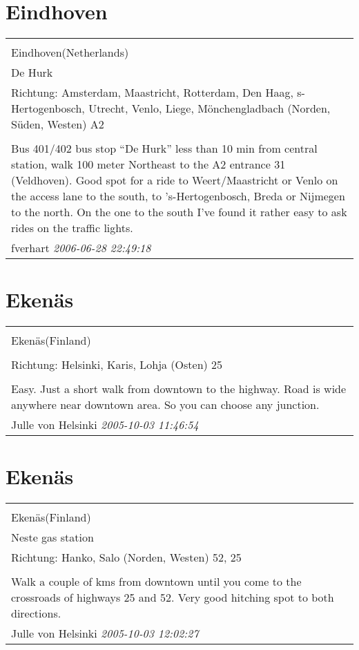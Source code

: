 \documentclass[a4paper,12pt]{article}
\begin{document}
\section{Eindhoven}
\begin{tabular}{|p{13cm}|}
\hline\\
Eindhoven(Netherlands)\\
De Hurk\\
Richtung: Amsterdam, Maastricht, Rotterdam, Den Haag, s-Hertogenbosch, Utrecht, Venlo, Liege, Mönchengladbach (Norden, Süden, Westen) A2 \\
\hline\\
Bus 401/402 bus stop “De Hurk” less than 10 min from central station, walk 100 meter Northeast to the A2 entrance 31 (Veldhoven). Good spot for a ride to Weert/Maastricht or Venlo on the access lane to the south, to 's-Hertogenbosch, Breda or Nijmegen to the north. On the one to the south I've found it rather easy to ask rides on the traffic lights. \\
fverhart \textit{ 2006-06-28 22:49:18 }\\\hline
\end{tabular}


\section{Ekenäs}
\begin{tabular}{|p{13cm}|}
\hline\\
Ekenäs(Finland)\\
\\
Richtung: Helsinki, Karis, Lohja (Osten) 25 \\
\hline\\
Easy. Just a short walk from downtown to the highway. Road is wide anywhere near downtown area. So you can choose any junction. \\
Julle von Helsinki \textit{ 2005-10-03 11:46:54 }\\\hline
\end{tabular}


\section{Ekenäs}
\begin{tabular}{|p{13cm}|}
\hline\\
Ekenäs(Finland)\\
Neste gas station\\
Richtung: Hanko, Salo (Norden, Westen) 52, 25 \\
\hline\\
Walk a couple of kms from downtown until you come to the crossroads of highways 25 and 52. Very good hitching spot to both directions. \\
Julle von Helsinki \textit{ 2005-10-03 12:02:27 }\\\hline
\end{tabular}
\end{document}
